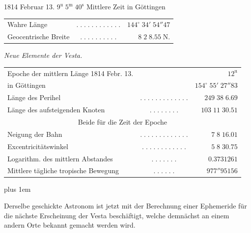 \begin{center}1814 Februar 13. $9^{\mathrm u}\;5^{\mathrm m}\;40^{\mathrm s}$ Mittlere Zeit in Göttingen\end{center}
\begin{center}\fontsize{10}{12}\selectfont\setlength{\tabcolsep}{2pt}\renewcommand{\arraystretch}{1.15}\begin{tabular}{lcr}
Wahre Länge & $.\;.\;.\;.\;.\;.\;.\;.\;.\;.\;.\;.$ & $144^\circ\;34'\;54''47$\\
Geocentrische Breite & $.\;.\;.\;.\;.\;.\;.\;.\;.\;.$ & $8\;2\;8.55\;\mathrm{N.}$\\
\end{tabular}\end{center}

\begin{center}\emph{Neue Elemente der Vesta.}\end{center}

\begin{center}\fontsize{9}{11}\selectfont\setlength{\tabcolsep}{2pt}\renewcommand{\arraystretch}{1.15}\begin{tabular}{lcr}
Epoche der mittlern Länge 1814 Febr. 13. & & $12^{\mathrm u}$\\
in Göttingen & & $154^\circ\;55'\;27''83$\\
Länge des Perihel & $.\;.\;.\;.\;.\;.\;.\;.\;.\;.\;.\;.\;.$ & $249\;38\;6.69$\\
Länge des aufsteigenden Knoten & $.\;.\;.\;.\;.\;.\;.\;.$ & $103\;11\;30.51$\\
\multicolumn{3}{c}{Beide für die Zeit der Epoche}\\
Neigung der Bahn & $.\;.\;.\;.\;.\;.\;.\;.\;.\;.\;.\;.\;.$ & $7\;8\;16.01$\\
Excentricitätswinkel & $.\;.\;.\;.\;.\;.\;.\;.\;.\;.\;.\;.$ & $5\;8\;30.75$\\
Logarithm. des mittlern Abstandes & $.\;.\;.\;.\;.\;.\;.$ & $0.3731261$\\
Mittlere tägliche tropische Bewegung & $.\;.\;.\;.\;.\;.$ & $977''95156$\\
\end{tabular}\end{center}

{\rightskip=0pt plus 1em \par\indent Derselbe geschickte Astronom ist jetzt mit der Berechnung einer Ephemeride für die nächste
Erscheinung der Vesta beschäftigt, welche demnächst an einem andern Orte bekannt gemacht
werden wird.\par}

